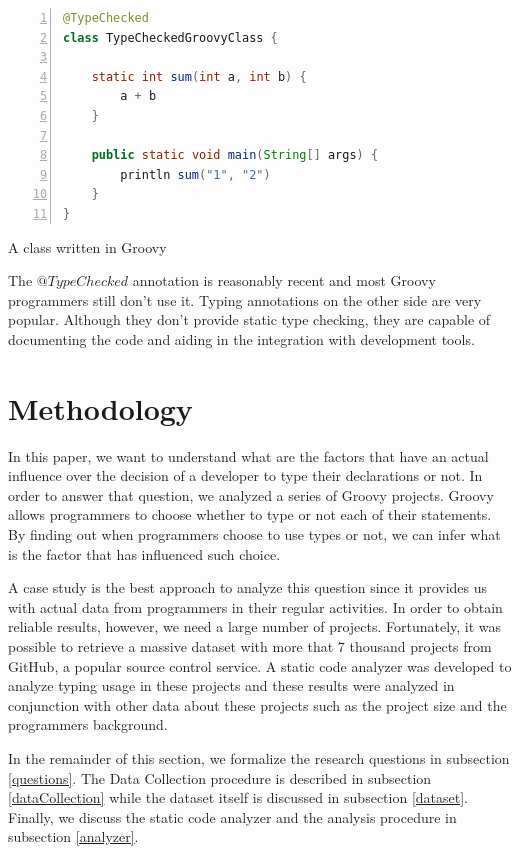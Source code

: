 \documentclass[preprint]{sigplanconf}
\begin{document}
\begin{Listing}[ht]
\begin{lstlisting}[language=Java,tabsize=2,breaklines=true,numbers=left]
@TypeChecked
class TypeCheckedGroovyClass {
	
	static int sum(int a, int b) {
		a + b
	}

	public static void main(String[] args) {
		println sum("1", "2")
	}
}
\end{lstlisting}
\caption{A class written in Groovy}
\label{staticTyping}
\end{Listing}

The $@TypeChecked$ annotation is reasonably recent and most Groovy programmers still don't use it. 
Typing annotations on the other side are very popular.
Although they don't provide static type checking, they are capable of documenting the code and aiding in the integration with development tools.








%
%

\section{Methodology\label{sec:Methodology}}
In this paper, we want to understand what are the factors that have an actual influence over the decision of a developer to type their declarations or not. 
In order to answer that question, we analyzed a series of Groovy projects.
Groovy allows programmers to choose whether to type or not each of their statements.
By finding out when programmers choose to use types or not, we can infer what is the factor that has influenced such choice.

A case study is the best approach to analyze this question since it provides us with actual data from programmers in their regular activities.
In order to obtain reliable results, however, we need a large number of projects.
Fortunately, it was possible to retrieve a massive dataset with more that 7 thousand projects from GitHub, a popular source control service. 
A static code analyzer was developed to analyze typing usage in these projects and these results were analyzed in conjunction with other data about these projects such as the project size and the programmers background.


In the remainder of this section, we formalize the research questions in subsection \ref{questions}. The Data Collection procedure is described in subsection \ref{dataCollection} while the dataset itself is discussed in subsection \ref{dataset}. Finally, we discuss the static code analyzer and the analysis procedure in subsection \ref{analyzer}.
\end{document}
